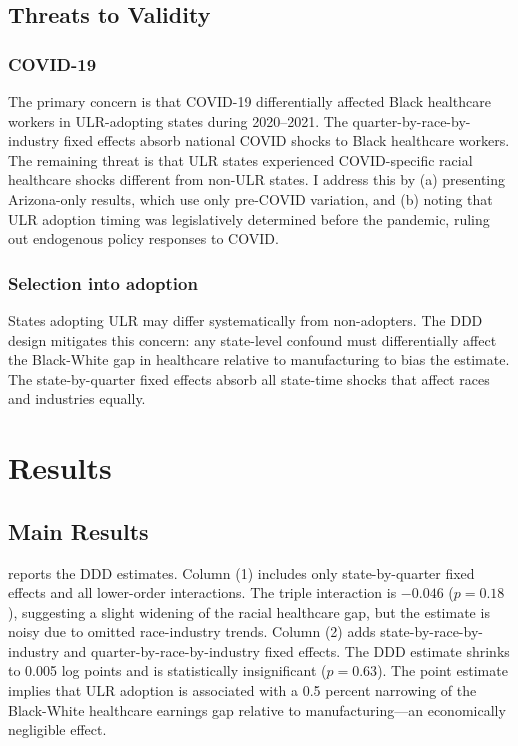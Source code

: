 \documentclass[12pt]{article}
\begin{document}
\subsection{Threats to Validity}

\subsubsection*{COVID-19} The primary concern is that COVID-19 differentially affected Black healthcare workers in ULR-adopting states during 2020--2021. The quarter-by-race-by-industry fixed effects absorb national COVID shocks to Black healthcare workers. The remaining threat is that ULR states experienced COVID-specific racial healthcare shocks different from non-ULR states. I address this by (a) presenting Arizona-only results, which use only pre-COVID variation, and (b) noting that ULR adoption timing was legislatively determined before the pandemic, ruling out endogenous policy responses to COVID.

\subsubsection*{Selection into adoption} States adopting ULR may differ systematically from non-adopters. The DDD design mitigates this concern: any state-level confound must differentially affect the Black-White gap in healthcare relative to manufacturing to bias the estimate. The state-by-quarter fixed effects absorb all state-time shocks that affect races and industries equally.

\section{Results}

\subsection{Main Results}



 reports the DDD estimates. Column (1) includes only state-by-quarter fixed effects and all lower-order interactions. The triple interaction is $-0.046$ ($p = 0.18$), suggesting a slight widening of the racial healthcare gap, but the estimate is noisy due to omitted race-industry trends. Column (2) adds state-by-race-by-industry and quarter-by-race-by-industry fixed effects. The DDD estimate shrinks to 0.005 log points and is statistically insignificant ($p = 0.63$). The point estimate implies that ULR adoption is associated with a 0.5 percent narrowing of the Black-White healthcare earnings gap relative to manufacturing---an economically negligible effect.
\end{document}
